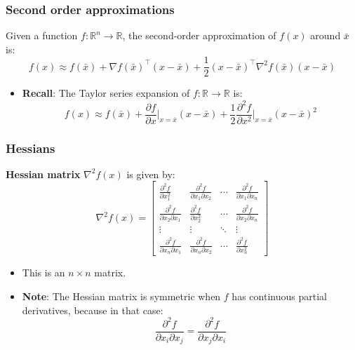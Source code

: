     \subsubsection{Second order approximations}
    \begin{definition}
        Given a function $f: \mathbb{R}^n \to \mathbb{R}$, the second-order approximation of $f(x)$ around $\bar{x}$ is:
        \begin{equation}
            f(x) \approx f(\bar{x}) + \nabla f(\bar{x})^\top (x - \bar{x}) + \frac{1}{2} (x - \bar{x})^\top \nabla^2 f(\bar{x}) (x - \bar{x})
        \end{equation}
        \begin{itemize}
            \item \textbf{Recall}: The Taylor series expansion of $f: \mathbb{R} \to \mathbb{R}$ is:
            \[
            f(x) \approx f(\bar{x}) + \frac{\partial f}{\partial x} \bigg|_{x = \bar{x}} (x - \bar{x}) + \frac{1}{2} \frac{\partial^2 f}{\partial x^2} \bigg|_{x = \bar{x}} (x - \bar{x})^2
            \]
        \end{itemize}
    \end{definition}

    \subsubsection{Hessians}
    \begin{definition}
        \textbf{Hessian matrix} $\nabla^2 f(x)$ is given by:
            \begin{equation}
                \nabla^2 f(x) = 
                \begin{bmatrix}
                    \frac{\partial^2 f}{\partial x_1^2} & \frac{\partial^2 f}{\partial x_1 \partial x_2} & \cdots & \frac{\partial^2 f}{\partial x_1 \partial x_n} \\
                    \frac{\partial^2 f}{\partial x_2 \partial x_1} & \frac{\partial^2 f}{\partial x_2^2} & \cdots & \frac{\partial^2 f}{\partial x_2 \partial x_n} \\
                    \vdots & \vdots & \ddots & \vdots \\
                    \frac{\partial^2 f}{\partial x_n \partial x_1} & \frac{\partial^2 f}{\partial x_n \partial x_2} & \cdots & \frac{\partial^2 f}{\partial x_n^2}
                \end{bmatrix}
            \end{equation}
            \begin{itemize}
                \item This is an $n \times n$ matrix.
                \item \textbf{Note}: The Hessian matrix is symmetric when $f$ has continuous partial derivatives, because in that case:
                \[
                \frac{\partial^2 f}{\partial x_i \partial x_j} = \frac{\partial^2 f}{\partial x_j \partial x_i}
                \]    
            \end{itemize}
    \end{definition}
